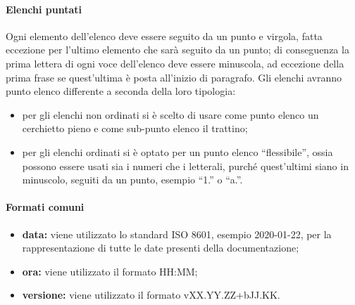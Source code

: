 			\paragraph{Elenchi puntati}
				Ogni elemento dell'elenco deve essere seguito da un punto e virgola, fatta eccezione per l'ultimo elemento che sarà seguito da un punto; di conseguenza la prima lettera di ogni voce dell'elenco deve essere minuscola, ad eccezione della prima frase se quest'ultima è posta all'inizio di paragrafo. Gli elenchi avranno punto elenco differente a seconda della loro tipologia:
				\begin{itemize}
					\item per gli elenchi non ordinati si è scelto di usare come punto elenco un cerchietto pieno e come sub-punto elenco il trattino;
					\item per gli elenchi ordinati si è optato per un punto elenco ``flessibile'', ossia possono essere usati sia i numeri che i letterali, purché quest'ultimi siano in minuscolo, seguiti da un punto, esempio ``1.'' o ``a.''.
				\end{itemize}
			\paragraph{Formati comuni}
				\begin{itemize}
					\item \textbf{data:} viene utilizzato lo standard ISO 8601, esempio 2020-01-22, per la rappresentazione di tutte le date presenti della documentazione;
					\item \textbf{ora:} viene utilizzato il formato HH:MM;
					\item \textbf{versione:} viene utilizzato il formato vXX.YY.ZZ+bJJ.KK.
				\end{itemize}
